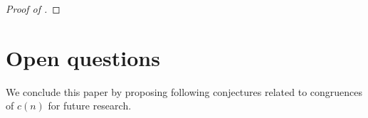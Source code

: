 \documentclass[12pt,reqno]{amsart}
\renewcommand{\d}{{\delta}}
\renewcommand{\o}{{\omega}}
\renewcommand{\(}{\left\(}
\renewcommand{\)}{\right\)}
\newcommand{\os}[2]{\overset{#1}{#2}}
\numberwithin{equation}{section}
\theoremstyle{plain}
\theoremstyle{definition}
\numberwithin{equation}{section}
\renewcommand{\pmod}[1]{\ \left( \mathrm{mod} \, #1 \right)}
\begin{document}
\begin{proof}[Proof of ]
\end{proof}






\section{Open questions}\label{sec5}

  We conclude this paper by proposing following conjectures related to congruences of $c(n)$ for future research.
\end{document}
